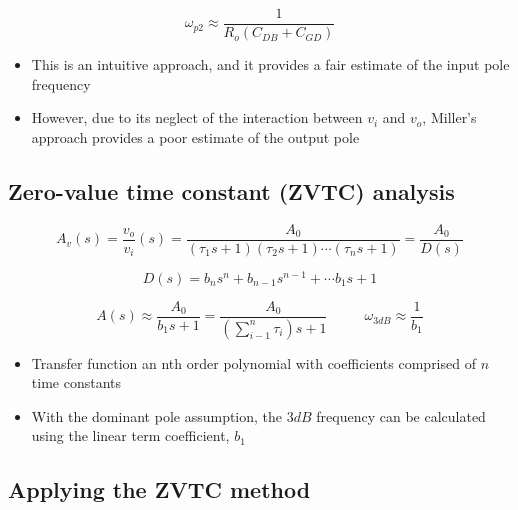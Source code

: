 \documentclass[11pt]{article}
\providecommand{\tightlist}{%
      \setlength{\itemsep}{0pt}\setlength{\parskip}{0pt}}
\begin{document}
\begin{equation}
\omega_{p2} \approx \dfrac{1}{R_o(C_{DB} + C_{GD})}
\end{equation}

\begin{itemize}
\tightlist
\item
  This is an intuitive approach, and it provides a fair estimate of the
  input pole frequency
\item
  However, due to its neglect of the interaction between \(v_i\) and
  \(v_o\), Miller's approach provides a poor estimate of the output pole
\end{itemize}

    \hypertarget{zero-value-time-constant-zvtc-analysis}{%
\subsection{Zero-value time constant (ZVTC)
analysis}\label{zero-value-time-constant-zvtc-analysis}}

    \begin{equation}
A_v(s) = \dfrac{v_o}{v_i}(s) = \dfrac{A_0}{(\tau_1 s + 1)(\tau_2 s + 1)\cdots (\tau_n s + 1)} = \dfrac{A_0}{D(s)}
\end{equation}

\begin{equation}
D(s) = b_n s^n + b_{n-1} s^{n-1} + \cdots b_1 s + 1
\end{equation}

\begin{equation}
A(s) \approx \dfrac{A_0}{b_1 s + 1} = \dfrac{A_0}{(\sum_{i-1}^n \tau_i) s + 1} \:\:\:\:\:\:\:\:\:\:\:\: \omega_{3dB} \approx \dfrac{1}{b_1}
\end{equation}

    \begin{itemize}
\tightlist
\item
  Transfer function an nth order polynomial with coefficients comprised
  of \(n\) time constants
\item
  With the dominant pole assumption, the \(3dB\) frequency can be
  calculated using the linear term coefficient, \(b_1\)
\end{itemize}

    \hypertarget{applying-the-zvtc-method}{%
\subsection{Applying the ZVTC method}\label{applying-the-zvtc-method}}
\end{document}
